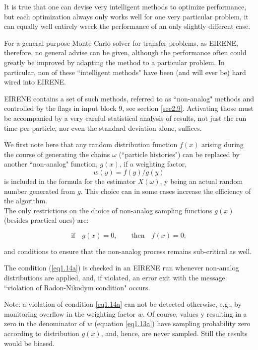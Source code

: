 It is true that one can devise very intelligent methods to
optimize performance, but each optimization always only works well
for one very particular problem, it can equally well entirely
wreck the performance of an only  slightly different case.

For a general purpose Monte Carlo solver for transfer problems, as
EIRENE, therefore, no general advise can be given, although the
performance often could greatly be improved by adapting the method
to a particular problem. In particular, non of these ``intelligent
methods" have been (and will ever be) hard wired into EIRENE.

EIRENE contains a set of such methods, referred to as
``non-analog" methods and controlled by the flags in input block
9, see section \ref{sec2.9}. Activating those must be accompanied
by a very careful statistical analysis of results, not just the
run time per particle, nor even the standard deviation alone,
suffices.


We first note here that any random distribution function $f(x)$
arising during the course of generating the chains $\omega$
(``particle histories") can be replaced by another ``non-analog"
function, $ g(x)$, if a weighting factor,
\begin{equation} \label{eq1.13a}
 w(y)   =   f(y) / g(y)
\end{equation}
is included in the formula for the estimator $X(\omega )$, y being
an actual random number generated from $ g $. This choice
can in some cases increase the efficiency of the algorithm.
\\
The only restrictions on the choice of non-analog sampling functions $g(x)$
(besides practical ones) are:

\begin{equation} \label{eq1.14a}
\mbox{if} \quad  g(x) = 0, \qquad \mbox{then}  \quad f(x)
= 0;
\end{equation}

and conditions to ensure that the non-analog process remains
sub-critical as well.

The condition (\ref{eq1.14a}) is checked in an EIRENE run whenever
non-analog distributions are applied, and, if violated, an error
exit with the message: ``violation of Radon-Nikodym condition"
occurs.

Note: a violation of condition \ref{eq1.14a} can not be detected
otherwise, e.g., by monitoring overflow in the weighting factor $w$.
Of course, values y resulting in a zero in the denominator of $w$
(equation \ref{eq1.13a}) have sampling probability zero according
to distribution $g(x)$, and, hence, are never sampled.
Still the results would be biased.

